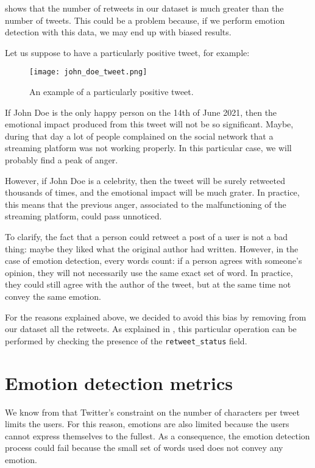  shows that the number of retweets in our dataset is much greater than the number of tweets. This could be a problem because, if we perform emotion detection with this data, we may end up with biased results. 

Let us suppose to have a particularly positive tweet, for example:

\begin{figure}[H]
	\centering
    	\texttt{[image: john\_doe\_tweet.png]}
    	\caption{An example of a particularly positive tweet.}
    	\label{fig:tweet-example}
\end{figure}

If John Doe is the only happy person on the 14th of June 2021, then the emotional impact produced from this tweet will not be so significant. Maybe, during that day a lot of people complained on the social network that a streaming platform was not working properly. In this particular case, we will probably find a peak of anger.

However, if John Doe is a celebrity, then the tweet will be surely retweeted thousands of times, and the emotional impact will be much grater. In practice, this means that the previous anger, associated to the malfunctioning of the streaming platform, could pass unnoticed.

To clarify, the fact that a person could retweet a post of a user is not a bad thing: maybe they liked what the original author had written. However, in the case of emotion detection, every words count: if a person agrees with someone's opinion, they will not necessarily use the same exact set of word. In practice, they could still agree with the author of the tweet, but at the same time not convey the same emotion.

For the reasons explained above, we decided to avoid this bias by removing from our dataset all the retweets. As explained in , this particular operation can be performed by checking the presence of the \texttt{retweet\_status} field. 

\section{Emotion detection metrics}
\label{sec:metrics}

We know from  that Twitter's constraint on the number of characters per tweet limits the users. For this reason, emotions are also limited because the users cannot express themselves to the fullest. As a consequence, the emotion detection process could fail because the small set of words used does not convey any emotion. 

